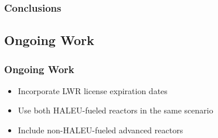 \begin{frame}
    \frametitle{Conclusions}

\end{frame}

\subsection{Ongoing Work}
\begin{frame}
    \frametitle{Ongoing Work}
    \begin{itemize}
        \item Incorporate \gls{LWR} license expiration dates
        \item Use both \gls{HALEU}-fueled reactors in the same scenario
        \item Include non-\gls{HALEU}-fueled advanced reactors
    \end{itemize}

    

\end{frame}